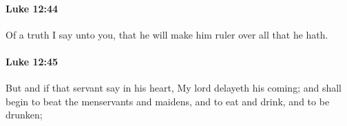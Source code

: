 		\paragraph{Luke 12:44} %
			\label{LUKE-12-44}

			Of a truth I say unto you, that he will make him ruler over all that he hath.

			\begin{framed}
			\scriptsize
				\begin{compactdesc}
					\item[SBLG] 
				\end{compactdesc}
			\end{framed}

		\paragraph{Luke 12:45} %
			\label{LUKE-12-45}

			But and if that servant say in his heart, My lord delayeth his coming; and shall begin to beat the menservants and maidens, and to eat and drink, and to be drunken;

